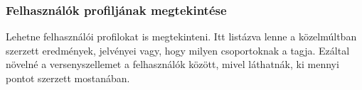 \subsubsection{Felhasználók profiljának megtekintése}
Lehetne felhasználói profilokat is megtekinteni. Itt listázva lenne a közelmúltban szerzett eredmények, jelvényei vagy, hogy milyen csoportoknak a tagja. Ezáltal növelné a versenyszellemet a felhasználók között, mivel láthatnák, ki mennyi pontot szerzett mostanában.
